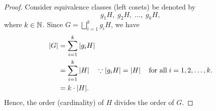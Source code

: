 \documentclass[11pt,openany]{article}
\begin{document}
\newpage
{}
\begin{proof}
Consider equivalence classes (left cosets) be denoted by \[
g_1H,\; g_2H,\; \dots,\; g_kH,
\] where \(k\in\mathbb{N}\). Since $
G = \bigsqcup_{i=1}^{k} g_iH$, we have \begin{align*}
	|G| &= \sum_{i=1}^{k} |g_iH|\\
	&=\sum_{i=1}^{k} |H|\quad\because \abs[0]{g_iH}=\abs[0]{H}\quad\text{for all}\; i=1,2,\dots,k. \\
	&= k\cdot |H|.
\end{align*} Hence, the order (cardinality) of $H$ divides the order of $G$.
\end{proof}
\vfill
{}
\end{document}
